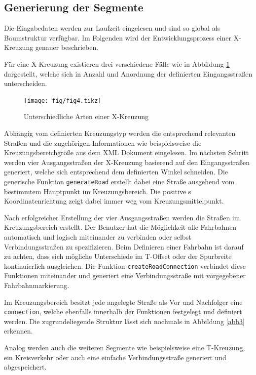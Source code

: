 \subsection{Generierung der Segmente}
Die Eingabedaten werden zur Laufzeit eingelesen und sind so global als Baumstruktur verfügbar. Im Folgenden wird der Entwicklungsprozess einer X-Kreuzung genauer beschrieben.

Für eine X-Kreuzung existieren drei verschiedene Fälle wie in Abbildung \ref{abb4} dargestellt, welche sich in Anzahl und Anordnung der definierten Eingangsstraßen unterscheiden.

\begin{figure}[H]
\flushleft
\texttt{[image: fig/fig4.tikz]}
\caption{Unterschiedliche Arten einer X-Kreuzung}
\label{abb4}
\end{figure}

Abhängig vom definierten Kreuzungstyp werden die entsprechend relevanten Straßen und die zugehörigen Informationen wie beispielsweise die Kreuzungsbereichgröße aus dem XML Dokument eingelesen. Im nächsten Schritt werden vier Ausgangsstraßen der X-Kreuzung basierend auf den Eingangsstraßen generiert, welche sich entsprechend dem definierten Winkel schneiden. Die generische Funktion \texttt{generateRoad} erstellt dabei eine Straße ausgehend vom bestimmtem Hauptpunkt im Kreuzungsbereich. Die positive s Koordinatenrichtung zeigt dabei immer weg vom Kreuzungsmittelpunkt.

Nach erfolgreicher Erstellung der vier Ausgangsstraßen werden die Straßen im Kreuzungsbereich erstellt. Der Benutzer hat die Möglichkeit alle Fahrbahnen automatisch und logisch miteinander zu verbinden oder selbst Verbindungsstraßen zu spezifizieren. Beim Definieren einer Fahrbahn ist darauf zu achten, dass sich mögliche Unterschiede im T-Offset oder der Spurbreite kontinuierlich ausgleichen. Die Funktion \texttt{createRoadConnection} verbindet diese Funktionen miteinander und generiert eine Verbindungsstraße mit vorgegebener Fahrbahnmarkierung.

Im Kreuzungsbereich besitzt jede angelegte Straße als Vor und Nachfolger eine \texttt{connection}, welche ebenfalls innerhalb der Funktionen festgelegt und definiert werden. Die zugrundeliegende Struktur lässt sich nochmals in Abbildung \ref{abb3} erkennen.

Analog werden auch die weiteren Segmente wie beispielsweise eine T-Kreuzung, ein Kreisverkehr oder auch eine einfache Verbindungsstraße generiert und abgespeichert.

